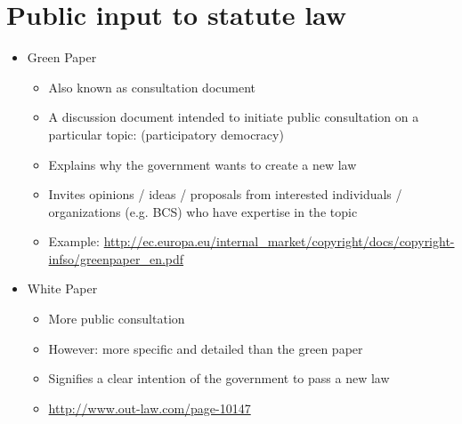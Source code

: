 \documentclass{article}
\begin{document}
\section{Public input to statute law}
\begin{itemize}
\item Green Paper 
\begin{itemize}
\item Also known as consultation document
\item A discussion document intended to initiate public consultation on a particular topic: (participatory democracy)
\item Explains why the government wants to create a new law
\item Invites opinions / ideas / proposals from interested individuals / organizations (e.g. BCS) who have expertise in the topic
\item Example: \url{http://ec.europa.eu/internal_market/copyright/docs/copyright-infso/greenpaper_en.pdf}
\end{itemize}

\item White Paper
\begin{itemize}
\item More public consultation
\item However: more specific and detailed than the green paper
\item Signifies a clear intention of the government to pass a new law
\item \url{http://www.out-law.com/page-10147}
\end{itemize}
\end{itemize}
\end{document}
